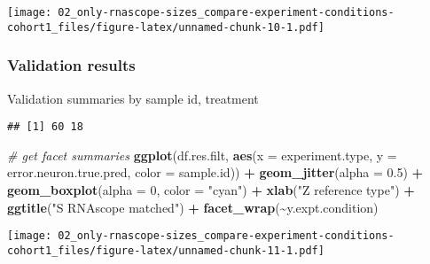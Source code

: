 \documentclass[
]{article}
\newenvironment{Shaded}{\begin{snugshade}}{\end{snugshade}}
\newcommand{\AttributeTok}[1]{\textcolor[rgb]{0.13,0.29,0.53}{#1}}
\newcommand{\CommentTok}[1]{\textcolor[rgb]{0.56,0.35,0.01}{\textit{#1}}}
\newcommand{\DecValTok}[1]{\textcolor[rgb]{0.00,0.00,0.81}{#1}}
\newcommand{\FloatTok}[1]{\textcolor[rgb]{0.00,0.00,0.81}{#1}}
\newcommand{\FunctionTok}[1]{\textcolor[rgb]{0.13,0.29,0.53}{\textbf{#1}}}
\newcommand{\NormalTok}[1]{#1}
\newcommand{\OtherTok}[1]{\textcolor[rgb]{0.56,0.35,0.01}{#1}}
\newcommand{\SpecialCharTok}[1]{\textcolor[rgb]{0.81,0.36,0.00}{\textbf{#1}}}
\newcommand{\StringTok}[1]{\textcolor[rgb]{0.31,0.60,0.02}{#1}}
\begin{document}
\texttt{[image: 02\_only-rnascope-sizes\_compare-experiment-conditions-cohort1\_files/figure-latex/unnamed-chunk-10-1.pdf]}

\hypertarget{validation-results}{%
\subsubsection{Validation results}\label{validation-results}}

Validation summaries by sample id, treatment

\begin{Shaded}
\end{Shaded}

\begin{verbatim}
## [1] 60 18
\end{verbatim}

\begin{Shaded}
\begin{Highlighting}[]
\CommentTok{\# get facet summaries}
\FunctionTok{ggplot}\NormalTok{(df.res.filt, }\FunctionTok{aes}\NormalTok{(}\AttributeTok{x =}\NormalTok{ experiment.type, }
                        \AttributeTok{y =}\NormalTok{ error.neuron.true.pred, }\AttributeTok{color =}\NormalTok{ sample.id)) }\SpecialCharTok{+} \FunctionTok{geom\_jitter}\NormalTok{(}\AttributeTok{alpha =} \FloatTok{0.5}\NormalTok{) }\SpecialCharTok{+} 
  \FunctionTok{geom\_boxplot}\NormalTok{(}\AttributeTok{alpha =} \DecValTok{0}\NormalTok{, }\AttributeTok{color =} \StringTok{"cyan"}\NormalTok{) }\SpecialCharTok{+} \FunctionTok{xlab}\NormalTok{(}\StringTok{"Z reference type"}\NormalTok{) }\SpecialCharTok{+}
  \FunctionTok{ggtitle}\NormalTok{(}\StringTok{"S RNAscope matched"}\NormalTok{) }\SpecialCharTok{+} \FunctionTok{facet\_wrap}\NormalTok{(}\SpecialCharTok{\textasciitilde{}}\NormalTok{y.expt.condition)}
\end{Highlighting}
\end{Shaded}

\texttt{[image: 02\_only-rnascope-sizes\_compare-experiment-conditions-cohort1\_files/figure-latex/unnamed-chunk-11-1.pdf]}
\end{document}
